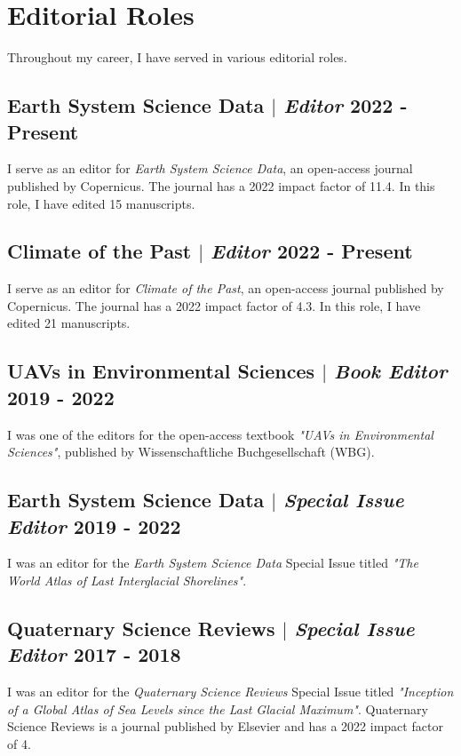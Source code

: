 \documentclass[11pt]{article}
\begin{document}
\section{Editorial Roles}
{\normalfont Throughout my career, I have served in various editorial roles.}\\

\bigskip

\subsection{Earth System Science Data $|$ {\normalfont\textit{Editor}} \hfill 2022 - Present}
{\footnotesize I serve as an editor for \textit{Earth System Science Data}, an open-access journal published by Copernicus. The journal has a 2022 impact factor of 11.4. In this role, I have edited 15 manuscripts.}
\bigskip

\subsection{Climate of the Past $|$ {\normalfont\textit{Editor}} \hfill 2022 - Present}
{\footnotesize I serve as an editor for \textit{Climate of the Past}, an open-access journal published by Copernicus. The journal has a 2022 impact factor of 4.3. In this role, I have edited 21 manuscripts.}
\bigskip

\subsection{UAVs in Environmental Sciences $|$ {\normalfont\textit{Book Editor}} \hfill 2019 - 2022}
{\footnotesize I was one of the editors for the open-access textbook \textit{"UAVs in Environmental Sciences"}, published by Wissenschaftliche Buchgesellschaft (WBG).}
\bigskip

\subsection{Earth System Science Data $|$ {\normalfont\textit{Special Issue Editor}} \hfill 2019 - 2022}
{\footnotesize I was an editor for the \textit{Earth System Science Data} Special Issue titled \textit{"The World Atlas of Last Interglacial Shorelines"}.}
\bigskip

\subsection{Quaternary Science Reviews $|$ {\normalfont\textit{Special Issue Editor}} \hfill 2017 - 2018}
{\footnotesize I was an editor for the \textit{Quaternary Science Reviews} Special Issue titled \textit{"Inception of a Global Atlas of Sea Levels since the Last Glacial Maximum"}. Quaternary Science Reviews is a journal published by Elsevier and has a 2022 impact factor of 4.}
\bigskip
\end{document}
